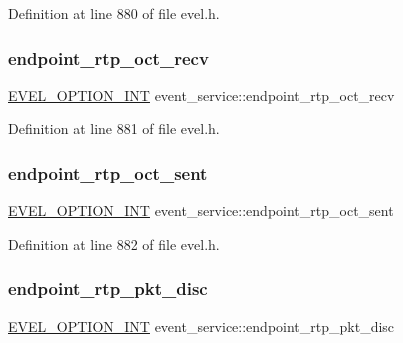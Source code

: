 Definition at line 880 of file evel.\+h.

\hypertarget{structevent__service_a2b500295e5e5f7acbe22a47825fe1d41}{}\label{structevent__service_a2b500295e5e5f7acbe22a47825fe1d41} 
\subsubsection{\texorpdfstring{endpoint\+\_\+rtp\+\_\+oct\+\_\+recv}{endpoint\_rtp\_oct\_recv}}
{\footnotesize\ttfamily \hyperlink{evel_8h_a452d825778d1c2368a54b8f689a25ba7}{E\+V\+E\+L\+\_\+\+O\+P\+T\+I\+O\+N\+\_\+\+I\+NT} event\+\_\+service\+::endpoint\+\_\+rtp\+\_\+oct\+\_\+recv}



Definition at line 881 of file evel.\+h.

\hypertarget{structevent__service_aba2edbc6092d913e34f3efff0b96687a}{}\label{structevent__service_aba2edbc6092d913e34f3efff0b96687a} 
\subsubsection{\texorpdfstring{endpoint\+\_\+rtp\+\_\+oct\+\_\+sent}{endpoint\_rtp\_oct\_sent}}
{\footnotesize\ttfamily \hyperlink{evel_8h_a452d825778d1c2368a54b8f689a25ba7}{E\+V\+E\+L\+\_\+\+O\+P\+T\+I\+O\+N\+\_\+\+I\+NT} event\+\_\+service\+::endpoint\+\_\+rtp\+\_\+oct\+\_\+sent}



Definition at line 882 of file evel.\+h.

\hypertarget{structevent__service_a01cd2b29f1f8510f43a1d756de3b311a}{}\label{structevent__service_a01cd2b29f1f8510f43a1d756de3b311a} 
\subsubsection{\texorpdfstring{endpoint\+\_\+rtp\+\_\+pkt\+\_\+disc}{endpoint\_rtp\_pkt\_disc}}
{\footnotesize\ttfamily \hyperlink{evel_8h_a452d825778d1c2368a54b8f689a25ba7}{E\+V\+E\+L\+\_\+\+O\+P\+T\+I\+O\+N\+\_\+\+I\+NT} event\+\_\+service\+::endpoint\+\_\+rtp\+\_\+pkt\+\_\+disc}



